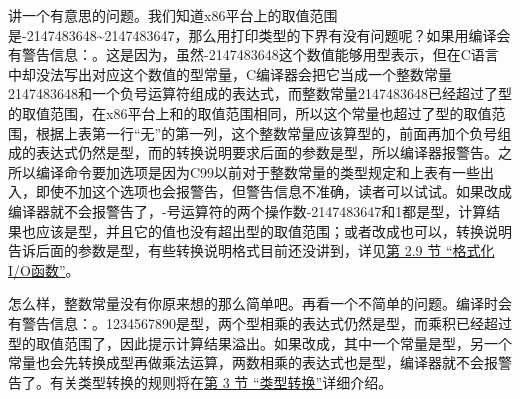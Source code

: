 讲一个有意思的问题。我们知道x86平台上的取值范围是-2147483648\textasciitilde{}\BookSplit{}2147483647，那么用打印类型的下界有没有问题呢？如果用编译会有警告信息：。这是因为，虽然-2147483648这个数值能够用型表示，但在C语言中却没法写出对应这个数值的型常量，C编译器会把它当成一个整数常量2147483648和一个负号运算符组成的表达式，而整数常量2147483648已经超过了型的取值范围，在x86平台上和的取值范围相同，所以这个常量也超过了型的取值范围，根据上表第一行“无”的第一列，这个整数常量应该算型的，前面再加个负号组成的表达式仍然是型，而的转换说明要求后面的参数是型，所以编译器报警告。之所以编译命令要加选项是因为C99以前对于整数常量的类型规定和上表有一些出入，即使不加这个选项也会报警告，但警告信息不准确，读者可以试试。如果改成编译器就不会报警告了，-号运算符的两个操作数-2147483647和1都是型，计算结果也应该是型，并且它的值也没有超出型的取值范围；或者改成也可以，转换说明告诉后面的参数是型，有些转换说明格式目前还没讲到，详见\hyperlink{db.ch25s02.id2832755}{第 2.\BookSplit{}9 节 “格式化I/\BookSplit{}O函数”}。



怎么样，整数常量没有你原来想的那么简单吧。再看一个不简单的问题。编译时会有警告信息：。1234567890是型，两个型相乘的表达式仍然是型，而乘积已经超过型的取值范围了，因此提示计算结果溢出。如果改成，其中一个常量是型，另一个常量也会先转换成型再做乘法运算，两数相乘的表达式也是型，编译器就不会报警告了。有关类型转换的规则将在\hyperlink{db.ch15s03.id2757924}{第 3 节 “类型转换”}详细介绍。

